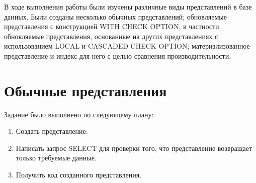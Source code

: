 \documentclass[otchet]{SCWorks}
\begin{document}

\date{2026}

\maketitle

\secNumbering

\tableofcontents




\intro
В ходе выполнения работы были изучены различные виды представлений в базе данных. Были созданы несколько обычных представлений; обновляемые представления с конструкцией WITH CHECK OPTION, в частности обновляемые представления, основанные на других представлениях с использованием LOCAL и CASCADED CHECK OPTION; материализованное представление и индекс для него с целью сравнения производительности.

\section{Обычные представления}

Задание было выполнено по следующему плану:

\begin{enumerate}
\item Создать представление.
\item Написать запрос SELECT для проверки того, что представление возвращает только требуемые данные.
\item Получить код созданного представления.
\end{enumerate}
\end{document}
